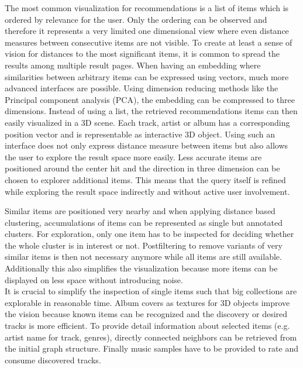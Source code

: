 \documentclass[sigconf]{acmart}
\begin{document}
The most common visualization for recommendations is a list of items which is ordered by relevance for the user. Only the ordering can be observed and therefore it represents a very limited one dimensional view where even distance measures between consecutive items are not visible. To create at least a sense of vision for distances to the most significant items, it is common to spread the results among multiple result pages. 
When having an embedding where similarities between arbitrary items can be expressed using vectors, much more advanced interfaces are possible. Using dimension reducing methods like the Principal component analysis (PCA), the embedding can be compressed to three dimensions. Instead of using a list, the retrieved recommendations items can then easily visualized in a 3D scene. Each track, artist or album has a corresponding position vector and is representable as interactive 3D object. Using such an interface does not only express distance measure between items but also allows the user to explore the result space more easily. Less accurate items are positioned around the center hit and the direction in three dimension can be chosen to explorer additional items. This means that the query itself is refined while exploring the result space indirectly and without active user involvement.

Similar items are positioned very nearby and when applying distance based clustering, accumulations of items can be represented as single but annotated clusters. For exploration, only one item has to be inspected for deciding whether the whole cluster is in interest or not. Postfiltering to remove variants of very similar items is then not necessary anymore while all items are still available. Additionally this also simplifies the visualization because more items can be displayed on less space without introducing noise.\\

It is crucial to simplify the inspection of single items such that big collections are explorable in reasonable time. Album covers as textures for 3D objects improve the vision because known items can be recognized and the discovery or desired tracks is more efficient\cite{libeks2011you}. To provide detail information about selected items (e.g. artist name for track, genres), directly connected neighbors can be retrieved from the initial graph structure. Finally music samples have to be provided to rate and consume discovered tracks. \\
\end{document}

